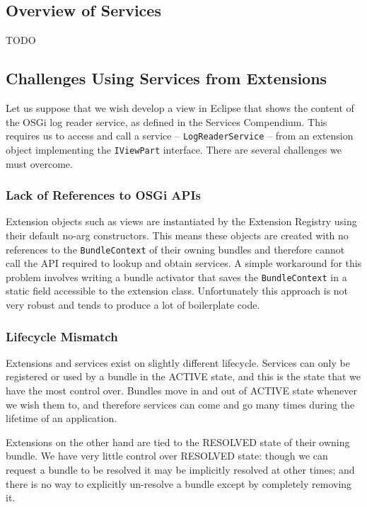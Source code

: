 \documentclass[12pt]{article}
\begin{document}
\subsection{Overview of Services}

TODO

\subsection{Challenges Using Services from Extensions}

Let us suppose that we wish develop a view in Eclipse that shows the content of the OSGi log reader service, as defined in the Services Compendium. This requires us to access and call a service -- \texttt{LogReaderService} -- from an extension object implementing the \texttt{IViewPart} interface. There are several challenges we must overcome.

\subsubsection{Lack of References to OSGi APIs}

Extension objects such as views are instantiated by the Extension Registry using their default no-arg constructors. This means these objects are created with no references to the \texttt{BundleContext} of their owning bundles and therefore cannot call the API required to lookup and obtain services. A simple workaround for this problem involves writing a bundle activator that saves the \texttt{BundleContext} in a static field accessible to the extension class. Unfortunately this approach is not very robust and tends to produce a lot of boilerplate code.

\subsubsection{Lifecycle Mismatch}

Extensions and services exist on slightly different lifecycle. Services can only be registered or used by a bundle in the ACTIVE state, and this is the state that we have the most control over. Bundles move in and out of ACTIVE state whenever we wish them to, and therefore services can come and go many times during the lifetime of an application.

Extensions on the other hand are tied to the RESOLVED state of their owning bundle. We have very little control over RESOLVED state: though we can request a bundle to be resolved it may be implicitly resolved at other times; and there is no way to explicitly un-resolve a bundle except by completely removing it.
\end{document}
